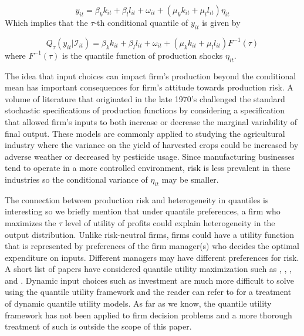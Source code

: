 \documentclass[11pt]{article}
\begin{document}
\begin{equation} \label{locationscale}
    y_{it}=\beta_{k}k_{it}+\beta_{l}l_{it}+\omega_{it}+(\mu_{k}k_{it}+\mu_{l}l_{it})\eta_{it}
\end{equation}
Which implies that the $\tau$-th conditional quantile of $y_{it}$ is given by

\begin{equation}
Q_{\tau}(y_{it}|\mathcal{I}_{it})=\beta_{k}k_{it}+\beta_{l}l_{it}+\omega_{it}+(\mu_{k}k_{it}+\mu_{l}l_{it})F^{-1}(\tau)
\end{equation}
where $F^{-1}(\tau)$ is the quantile function of production shocks $\eta_{it}$.

The idea that input choices can impact firm's production beyond the conditional mean has important consequences for firm's attitude towards production risk. A volume of literature that originated in the late 1970's challenged the standard stochastic specifications of production functions \citep{Just1978,Just1979} by considering a specification that allowed firm's inputs to both increase or decrease the marginal variability of final output. These models are commonly applied to studying the agricultural industry where the variance on the yield of harvested crops could be increased by adverse weather or decreased by pesticide usage. Since manufacturing businesses tend to operate in a more controlled environment, risk is less prevalent in these industries so the conditional variance of $\eta_{it}$ may be smaller.

The connection between production risk and heterogeneity in quantiles is interesting so we briefly mention that under quantile preferences, a firm who maximizes the $\tau$ level of utility of profits could explain heterogeneity in the output distribution. Unlike risk-neutral firms, firms could have a utility function that is represented by preferences of the firm manager(s) who decides the optimal expenditure on inputs. Different managers may have different preferences for risk. A short list of papers have considered quantile utility maximization such as \cite{Manski1988}, \cite{ROSTEK2009}, \cite{Chambers2007}, and \cite{Bhattacharya2009}. Dynamic input choices such as investment are much more difficult to solve using the quantile utility framework and the reader can refer to \cite{Castro2017} for a treatment of dynamic quantile utility models. As far as we know, the quantile utility framework has not been applied to firm decision problems and a more thorough treatment of such is outside the scope of this paper.
\end{document}
